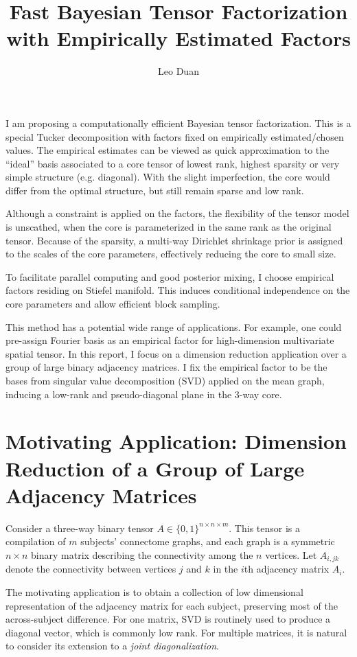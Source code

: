 \documentclass[10pt]{article}
\title{\textbf{Fast Bayesian Tensor Factorization\\ with Empirically Estimated Factors}}
\author{Leo Duan}
\date{}
\begin{document}
\maketitle

I am proposing a computationally efficient Bayesian tensor factorization. This is a special Tucker decomposition with factors fixed on empirically estimated/chosen values. The empirical estimates can be viewed as quick approximation to the ``ideal'' basis associated to a core tensor of lowest rank, highest sparsity or very simple structure (e.g. diagonal). With the slight imperfection, the core would differ from the optimal structure, but still remain sparse and low rank.

Although a constraint is applied on the factors, the flexibility of the tensor model is unscathed, when the core is parameterized in the same rank as the original tensor. Because of the sparsity, a multi-way Dirichlet shrinkage prior is assigned to the scales of the core parameters, effectively reducing the core to small size.

To facilitate parallel computing and good posterior mixing, I choose empirical factors residing on Stiefel manifold. This induces conditional independence on the core parameters and allow efficient block sampling.

This method has a potential wide range of applications. For example, one could pre-assign Fourier basis as an empirical factor for high-dimension multivariate spatial tensor. In this report, I focus on a dimension reduction application over a group of large binary adjacency matrices. I fix the empirical factor to be the bases from singular value decomposition (SVD) applied on the mean graph, inducing a low-rank and pseudo-diagonal plane in the 3-way core.

\section{Motivating Application: Dimension Reduction of a Group of Large Adjacency Matrices}

Consider a three-way binary tensor $A\in \{0,1\}^{n\times n \times m}$. This tensor is a compilation of $m$ subjects' connectome graphs, and each graph is a symmetric $n\times n$ binary matrix describing the connectivity among the $n$ vertices. Let $A_{i,jk}$ denote the connectivity between vertices $j$ and $k$ in the $i$th adjacency matrix $A_{i}$.

The motivating application is to obtain a collection of low dimensional representation of the adjacency matrix for each subject, preserving most of the across-subject difference. For one matrix, SVD is routinely used to produce a diagonal vector, which is commonly low rank. For multiple matrices, it is natural to consider its extension to a {\it joint diagonalization}.
\end{document}
